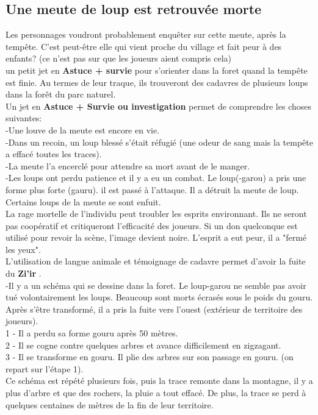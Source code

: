 \documentclass[oneside,12pt]{book}
\newcommand{\Thomas}{\textbf{Zi'ir} }
\begin{document}
\begin{flushleft}
\section{Une meute de loup est retrouvée morte}
\label{MeuteMorte}
Les personnages voudront probablement enquêter sur cette meute, après la tempête. C'est peut-être elle qui vient proche du village et fait peur à des enfants? (ce n'est pas sur que les joueurs aient compris cela) \\
un petit jet en \textbf{Astuce + survie} pour s'orienter dans la foret quand la tempête est finie. Au termes de leur traque, ils trouveront des cadavres de plusieurs loups dans la forêt du parc naturel. \\
Un jet en \textbf{Astuce + Survie ou investigation} permet de comprendre les choses suivantes:\\
-Une louve de la meute est encore en vie.\\
-Dans un recoin, un loup blessé s'était réfugié (une odeur de sang mais la tempête a effacé toutes les traces).\\ 
-La meute l'a encerclé pour attendre sa mort avant de le manger.\\
-Les loups ont perdu patience et il y a eu un combat. Le loup(-garou) a pris une forme plus forte (gauru). 
il est passé à l'attaque. Il a détruit la meute de loup. Certains loups de la meute se sont enfuit. \\
La rage mortelle de l'individu peut troubler les esprits environnant. Ils ne seront pas coopératif et critiqueront l'efficacité des joueurs. Si un don quelconque est utilisé pour revoir la scène, l'image devient noire. L'esprit a eut peur, il a "fermé les yeux".\\
L'utilisation de langue animale et témoignage de cadavre permet d'avoir la fuite du \Thomas.\\
-Il y a un schéma qui se dessine dans la foret. Le loup-garou ne semble pas avoir tué volontairement les loups. Beaucoup sont morts écrasés sous le poids du gouru. Après s’être transformé, il a pris la fuite vers l'ouest (extérieur de territoire des joueurs). \\
1 - Il a perdu sa forme gouru après 50 mètres.\\
2 - Il se cogne contre quelques arbres et avance difficilement en zigzagant.\\
3 - Il se transforme en gouru. Il plie des arbres sur son passage en gouru. (on repart sur l'étape 1).\\
Ce schéma est répété plusieurs fois, puis la trace remonte dans la montagne, il y a plus d'arbre et que des rochers, la pluie a tout effacé. De plus, la trace se perd à quelques centaines de mètres de la fin de leur territoire.\\


\end{flushleft}
\end{document}
